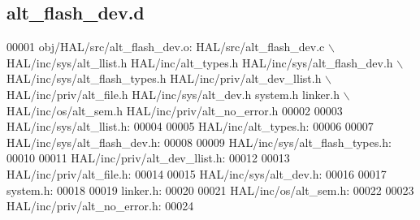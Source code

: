 \subsection{alt\+\_\+flash\+\_\+dev.\+d}
\label{alt__flash__dev_8d_source}

\begin{DoxyCode}
00001 obj/HAL/src/alt_flash_dev.o: HAL/src/alt_flash_dev.c \(\backslash\)
 HAL/inc/sys/alt_llist.h HAL/inc/alt\_types.h HAL/inc/sys/alt_flash_dev.h \(\backslash\)
 HAL/inc/sys/alt\_flash\_types.h HAL/inc/priv/alt_dev_llist.h \(\backslash\)
 HAL/inc/priv/alt\_file.h HAL/inc/sys/alt_dev.h system.h linker.h \(\backslash\)
 HAL/inc/os/alt\_sem.h HAL/inc/priv/alt_no_error.h
00002 
00003 HAL/inc/sys/alt_llist.h:
00004 
00005 HAL/inc/alt\_types.h:
00006 
00007 HAL/inc/sys/alt_flash_dev.h:
00008 
00009 HAL/inc/sys/alt\_flash\_types.h:
00010 
00011 HAL/inc/priv/alt_dev_llist.h:
00012 
00013 HAL/inc/priv/alt\_file.h:
00014 
00015 HAL/inc/sys/alt_dev.h:
00016 
00017 system.h:
00018 
00019 linker.h:
00020 
00021 HAL/inc/os/alt\_sem.h:
00022 
00023 HAL/inc/priv/alt_no_error.h:
00024 \end{DoxyCode}
